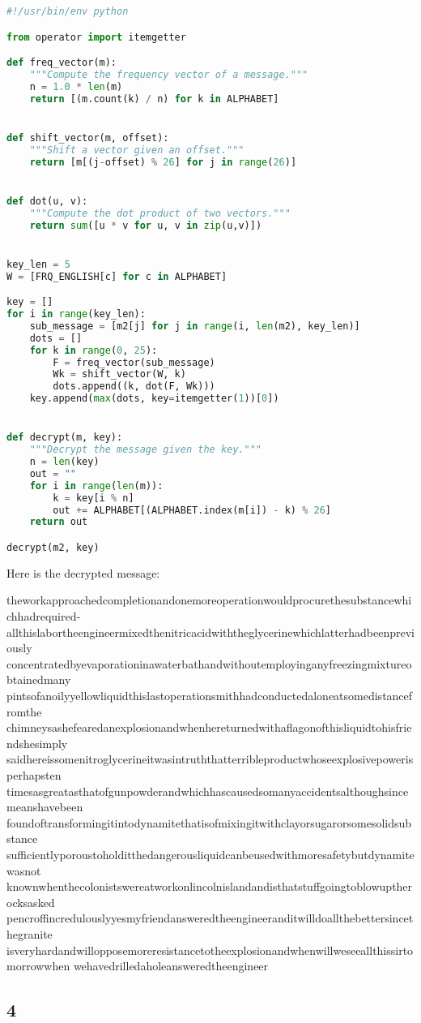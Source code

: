 \documentclass[12pt]{article}
\begin{document}
\newpage
\begin{lstlisting}[language=Python, caption=Code for decrypting the message from question 3]
#!/usr/bin/env python

from operator import itemgetter

def freq_vector(m):
    """Compute the frequency vector of a message."""
    n = 1.0 * len(m)
    return [(m.count(k) / n) for k in ALPHABET]


def shift_vector(m, offset):
    """Shift a vector given an offset."""
    return [m[(j-offset) % 26] for j in range(26)]


def dot(u, v):
    """Compute the dot product of two vectors."""
    return sum([u * v for u, v in zip(u,v)])


key_len = 5
W = [FRQ_ENGLISH[c] for c in ALPHABET]

key = []
for i in range(key_len):
    sub_message = [m2[j] for j in range(i, len(m2), key_len)]
    dots = []
    for k in range(0, 25):
        F = freq_vector(sub_message)
        Wk = shift_vector(W, k)
        dots.append((k, dot(F, Wk)))
    key.append(max(dots, key=itemgetter(1))[0])


def decrypt(m, key):
    """Decrypt the message given the key."""
    n = len(key)
    out = ""
    for i in range(len(m)):
        k = key[i % n]
        out += ALPHABET[(ALPHABET.index(m[i]) - k) % 26]
    return out

decrypt(m2, key)
\end{lstlisting}

Here is the decrypted message:

theworkapproachedcompletionandonemoreoperationwouldprocurethesubstancewhichhadrequired-
allthislabortheengineermixedthenitricacidwiththeglycerinewhichlatterhadbeenpreviously
concentratedbyevaporationinawaterbathandwithoutemployinganyfreezingmixtureobtainedmany
pintsofanoilyyellowliquidthislastoperationsmithhadconductedaloneatsomedistancefromthe
chimneysashefearedanexplosionandwhenhereturnedwithaflagonofthisliquidtohisfriendshesimply
saidhereissomenitroglycerineitwasintruththatterribleproductwhoseexplosivepowerisperhapsten
timesasgreatasthatofgunpowderandwhichhascausedsomanyaccidentsalthoughsincemeanshavebeen
foundoftransformingitintodynamitethatisofmixingitwithclayorsugarorsomesolidsubstance
sufficientlyporoustoholditthedangerousliquidcanbeusedwithmoresafetybutdynamitewasnot
knownwhenthecolonistswereatworkonlincolnislandandisthatstuffgoingtoblowuptherocksasked
pencroffincredulouslyyesmyfriendansweredtheengineeranditwilldoallthebettersincethegranite
isveryhardandwillopposemoreresistancetotheexplosionandwhenwillweseeallthissirtomorrowwhen
wehavedrilledaholeansweredtheengineer


\subsection*{4}
\end{document}
